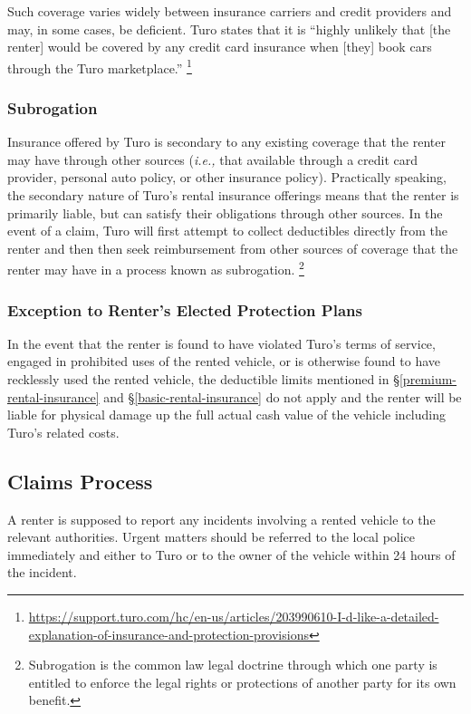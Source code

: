 \documentclass[review,12pt]{elsarticle}
\begin{document}
Such coverage varies widely between insurance carriers and credit providers and may, in some cases, be deficient. Turo states that it is ``highly unlikely that [the renter] would be covered by any credit card insurance when [they] book cars through the Turo marketplace.''
\footnote{\url{https://support.turo.com/hc/en-us/articles/203990610-I-d-like-a-detailed-explanation-of-insurance-and-protection-provisions}}

\subsubsection{Subrogation}
Insurance offered by Turo is secondary to any existing coverage that the renter may have through other sources (\emph{i.e.,} that available through a credit card provider, personal auto policy, or other insurance policy). Practically speaking, the secondary nature of Turo's rental insurance offerings means that the renter is primarily liable, but can satisfy their obligations through other sources. In the event of a claim, Turo will first attempt to collect deductibles directly from the renter and then then seek reimbursement from other sources of coverage that the renter may have in a process known as subrogation.
\footnote{Subrogation is the common law legal doctrine through which one party is entitled to enforce the legal rights or protections of another party for its own benefit.
}


\subsubsection{Exception to Renter's Elected Protection Plans}
In the event that the renter is found to have violated Turo's terms of service, engaged in prohibited uses of the rented vehicle, or is otherwise found to have recklessly used the rented vehicle, the deductible limits mentioned in \S\ref{premium-rental-insurance} and \S\ref{basic-rental-insurance} do not apply and the renter will be liable for physical damage up the full actual cash value of the vehicle including Turo's related costs.

\subsection{Claims Process}\label{claims-process}
A renter is supposed to report any incidents involving a rented vehicle to the relevant authorities. Urgent matters should be referred to the local police immediately and either to Turo or to the owner of the vehicle within 24 hours of the incident.
\end{document}
